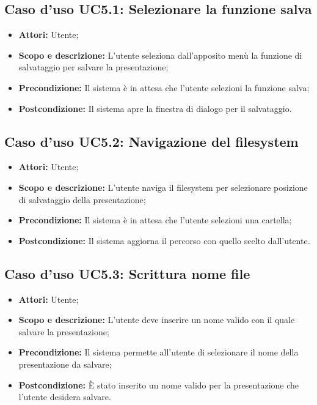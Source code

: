 \subsection{Caso d'uso UC5.1: Selezionare la funzione salva}
\begin{itemize}
	\item \textbf{Attori:} Utente;
	\item \textbf{Scopo e descrizione:} L'utente seleziona dall'apposito menù la funzione di salvataggio per salvare la presentazione;
	\item \textbf{Precondizione:} Il sistema è in attesa che l'utente selezioni la funzione salva;
	\item \textbf{Postcondizione:} Il sistema apre la finestra di dialogo per il salvataggio.
\end{itemize}

\subsection{Caso d'uso UC5.2: Navigazione del filesystem}
\begin{itemize}
	\item \textbf{Attori:} Utente;
	\item \textbf{Scopo e descrizione:} L'utente naviga il \gls{filesystem} per selezionare posizione di salvataggio della presentazione;
	\item \textbf{Precondizione:} Il sistema è in attesa che l'utente selezioni una cartella;
	\item \textbf{Postcondizione:} Il sistema aggiorna il percorso con quello scelto dall'utente.
\end{itemize}

\subsection{Caso d'uso UC5.3: Scrittura nome file}
\begin{itemize}
	\item \textbf{Attori:} Utente;
	\item \textbf{Scopo e descrizione:} L'utente deve inserire un nome valido con il quale salvare la presentazione;
	\item \textbf{Precondizione:} Il sistema permette all'utente di selezionare il nome della presentazione da salvare;
	\item \textbf{Postcondizione:} È stato inserito un nome valido per la presentazione che l'utente desidera salvare.
\end{itemize}

